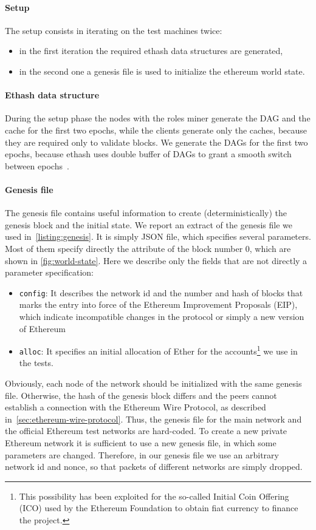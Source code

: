 \paragraph{Setup}
The setup consists in iterating on the test machines twice:
\begin{itemize}
  \item in the first iteration the required ethash data structures are generated,
  \item in the second one a genesis file is used to initialize the ethereum world
  state.
\end{itemize}


\paragraph{Ethash data structure}
During the setup phase the nodes with the roles miner generate the DAG and the
cache for the first two epochs, while the clients generate only the caches,
because they are required only to validate blocks. We generate the DAGs for the
first two epochs, because ethash uses double buffer of DAGs to grant a smooth
switch between epochs~\cite{bib:dagger-hashimoto}.


\paragraph{Genesis file}
The genesis file contains useful information to create (deterministically) the
genesis block and the initial state. We report an extract of the genesis file
we used in~\autoref{listing:genesis}. It is simply JSON file, which specifies
several parameters. Most of them specify directly the attribute of the block
number $0$, which are shown in \autoref{fig:world-state}. Here we describe
only the fields that are not directly a parameter specification:
\begin{itemize}
    \item \texttt{config}: It describes the network id and the number and hash
    of blocks that marks the entry into force of the Ethereum Improvement 
    Proposals (EIP), which indicate incompatible changes in the protocol or
    simply a new version of Ethereum
    \item \texttt{alloc}: It specifies an initial allocation of Ether for the
    accounts\footnote{This possibility has been exploited for the so-called
    Initial Coin Offering (ICO) used by the Ethereum Foundation to obtain fiat 
    currency to finance the project.} we use in the tests.
\end{itemize}
Obviously, each node of the network should be initialized with the same genesis 
file. Otherwise, the hash of the genesis block differs and the peers cannot
establish a connection with the Ethereum Wire Protocol, as described
in~\autoref{sec:ethereum-wire-protocol}. Thus, the genesis file for the main 
network  and the official Ethereum test networks are hard-coded. To create a 
new private Ethereum network it is sufficient to use a new genesis file, in 
which some parameters are changed. Therefore, in our genesis file we use an 
arbitrary network id and nonce, so that packets of different networks are 
simply dropped.

